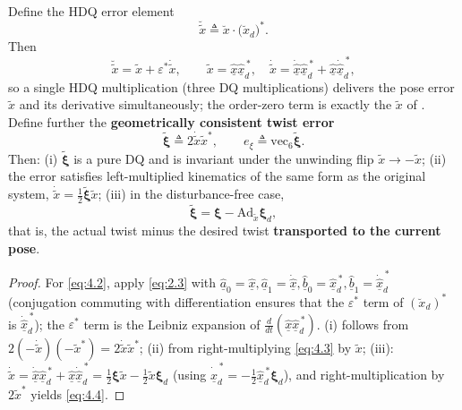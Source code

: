 \begin{theorem}\label{thm:1}
Define the HDQ error element
\begin{equation}
\breve{\tilde x}\triangleq \breve x\cdot\bigl(\breve x_d\bigr)^{*} .
\tag{4.1}\label{eq:4.1}
\end{equation}
Then
\begin{equation}
\breve{\tilde x}=\tilde x+\varepsilon^*\dot{\tilde x},\qquad
\tilde x=\hat{\underline x}\hat{\underline x}_d^{\,*},\quad
\dot{\tilde x}=\dot{\hat{\underline x}}\hat{\underline x}_d^{\,*}+\hat{\underline x}\dot{\hat{\underline x}}_d^{\,*},
\tag{4.2}\label{eq:4.2}
\end{equation}
so a single HDQ multiplication (three DQ multiplications) delivers the pose error $\tilde x$ and its derivative simultaneously; the order-zero term is exactly the $\tilde x$ of \cite{P2}. Define further the \textbf{geometrically consistent twist error}
\begin{equation}
\tilde{\boldsymbol\xi}\triangleq 2\dot{\tilde x}\tilde x^{*},\qquad
e_\xi\triangleq\mathrm{vec}_6\tilde{\boldsymbol\xi}.
\tag{4.3}\label{eq:4.3}
\end{equation}
Then: (i) $\tilde{\boldsymbol\xi}$ is a pure DQ and is invariant under the unwinding flip $\tilde x\to-\tilde x$; (ii) the error satisfies left-multiplied kinematics of the same form as the original system, $\dot{\tilde x}=\tfrac12\tilde{\boldsymbol\xi}\tilde x$; (iii) in the disturbance-free case,
\begin{equation}
\tilde{\boldsymbol\xi}=\boldsymbol\xi-\mathrm{Ad}_{\tilde x}\boldsymbol\xi_d ,
\tag{4.4}\label{eq:4.4}
\end{equation}
that is, the actual twist minus the desired twist \textbf{transported to the current pose}.
\end{theorem}

\begin{proof}
For \eqref{eq:4.2}, apply \eqref{eq:2.3} with $\hat{\underline a}_0=\hat{\underline x},\hat{\underline a}_1=\dot{\hat{\underline x}},\hat{\underline b}_0=\hat{\underline x}_d^{\,*},\hat{\underline b}_1=\dot{\hat{\underline x}}_d^{\,*}$ (conjugation commuting with differentiation ensures that the $\varepsilon^{*}$ term of $(\breve x_d)^*$ is $\dot{\hat{\underline x}}_d^{\,*}$); the $\varepsilon^{*}$ term is the Leibniz expansion of $\frac{d}{dt}(\hat{\underline x}\hat{\underline x}_d^{\,*})$. (i) follows from $2(-\dot{\tilde x})(-\tilde x^*)=2\dot{\tilde x}\tilde x^*$; (ii) from right-multiplying \eqref{eq:4.3} by $\tilde x$; (iii): $\dot{\tilde x}=\dot{\hat{\underline x}}\hat{\underline x}_d^{\,*}+\hat{\underline x}\dot{\hat{\underline x}}_d^{\,*}=\tfrac12\boldsymbol\xi\tilde x-\tfrac12\tilde x\boldsymbol\xi_d$ (using $\dot{\hat{\underline x}}_d^{\,*}=-\tfrac12\hat{\underline x}_d^{\,*}\boldsymbol\xi_d$), and right-multiplication by $2\tilde x^*$ yields \eqref{eq:4.4}.
\end{proof}

